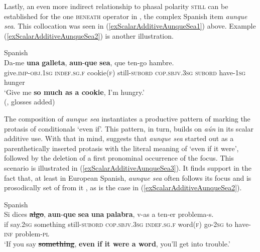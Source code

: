 {Lastly, an even more indirect relationship to phasal polarity \textsc{still} can be established for the one \textsc{beneath} operator in , the complex Spanish item \textit{aunque sea}. This collocation was seen in (\ref{exScalarAdditiveAunqueSea1}) above. Example (\ref{exScalarAdditiveAunqueSea2}) is another illustration.

\begin{exe}
	\ex Spanish\label{exScalarAdditiveAunqueSea2}\\
	\gll Da-me \textbf{una} \textbf{galleta}, \textbf{aun}-\textbf{que} \textbf{sea}, que ten-go hambre.\\
	give.\textsc{imp}-\textsc{obj}.1\textsc{sg} \textsc{indef}.\textsc{sg}.\textsc{f} cookie(\textsc{f}) still-\textsc{subord} \textsc{cop}.\textsc{sbjv}.3\textsc{sg} \textsc{subord} have-1\textsc{sg} hunger\\
	\glt \lq Give me \textbf{so much as a cookie}, I'm hungry.\rq{}\\(\cite[§47.12q]{RAEGramatica}, glosses added)
\end{exe}

The composition of \textit{aunque sea} instantiates a productive pattern of marking the protasis of  conditionals \lq even if\rq{}. This pattern, in turn, builds on \textit{aún} in its scalar additive use. With that in mind, \textcite{GastvanderAuwera2011} suggests that  \textit{aunque sea} started out as a parenthetically inserted protasis with the literal meaning of \lq even if it were\rq{}, followed by the deletion of a first pronominal occurrence of the focus. This scenario is illustrated in (\ref{exScalarAdditiveAunqueSea3}). It finds support in the fact that, at least in European Spanish, \textit{aunque sea} often follows its focus and is prosodically set of from it \parencite[§47.12q]{RAEGramatica}, as is the case in (\ref{exScalarAdditiveAunqueSea2}). 

\begin{exe}
	\ex Spanish\label{exScalarAdditiveAunqueSea3}\\
	\gll Si dices \sout{\textbf{algo}}, \textbf{aun}-\textbf{que} \textbf{sea} \textbf{una} \textbf{palabra}, v-as a ten-er problema-s.\\
	if say.2\textsc{sg} something still-\textsc{subord} \textsc{cop}.\textsc{sbjv}.3\textsc{sg} \textsc{indef}.\textsc{sg}.\textsc{f} word(\textsc{f}) go-2\textsc{sg} to have-\textsc{inf} problem-\textsc{pl}\\
	\glt \lq If you say \textbf{\sout{something}}, \textbf{even if it were a word}, you’ll get into trouble.'
	\\\parencite[356]{GastvanderAuwera2011}
\end{exe}

}
